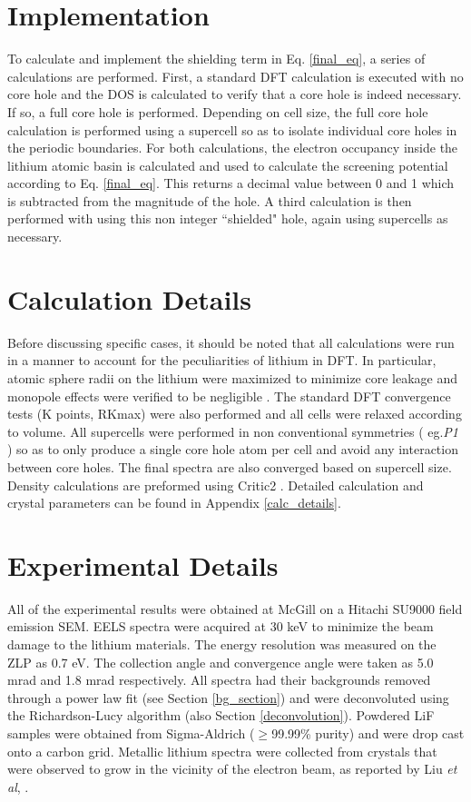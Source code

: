 \section{Implementation} \label{implementation}
To calculate and implement the shielding term in Eq. \ref{final_eq}, a series of calculations are performed.  First, a standard DFT calculation is executed with no core hole and the DOS is calculated to verify that a core hole is indeed necessary.  If so, a full core hole is performed. Depending on cell size, the full core hole calculation is performed using a supercell so as to isolate individual core holes in the periodic boundaries. For both calculations, the electron occupancy inside the lithium atomic basin is calculated and used to calculate the screening potential according to Eq. \ref{final_eq}.  This returns a decimal value between 0 and 1 which is subtracted from the magnitude of the hole.  A third calculation is then performed with using this non integer ``shielded" hole, again using supercells as necessary.  

\section{Calculation Details} \label{calc_section}
Before discussing specific cases, it should be noted that all calculations were run in a manner to account for the peculiarities of lithium in DFT. In particular, atomic sphere radii on the lithium were maximized to minimize core leakage and monopole effects were verified to be negligible \cite{mauchamp_ab_2006}.  The standard DFT convergence tests (K points, RKmax) were also performed and all cells were relaxed according to volume.  All supercells were performed in non conventional symmetries ( eg.\textit{P1} ) so as to only produce a single core hole atom per cell and avoid any interaction between core holes. The final spectra are also converged based on supercell size.  Density calculations are preformed using Critic2 \cite{critic2}.   Detailed calculation and crystal parameters can be found in Appendix \ref{calc_details}. \\


\section{Experimental Details} \label{expt_methods}
All of the experimental results were obtained at McGill on a Hitachi SU9000 field emission SEM.  EELS spectra were acquired at 30 keV to minimize the beam damage to the lithium materials. The energy resolution was measured on the ZLP as 0.7 eV.  The collection angle and convergence angle were taken as 5.0 mrad and 1.8 mrad respectively.  All spectra had their backgrounds removed through a power law fit (see Section \ref{bg_section}) and were deconvoluted using the Richardson-Lucy algorithm (also Section \ref{deconvolution}).   Powdered LiF samples were obtained from Sigma-Aldrich ($\ge$99.99\% purity) and were drop cast onto a carbon grid.  Metallic lithium spectra were collected from crystals that were observed to grow in the vicinity of the electron beam, as reported by Liu \textit{et al}, \cite{liu_preparation_1986}.
